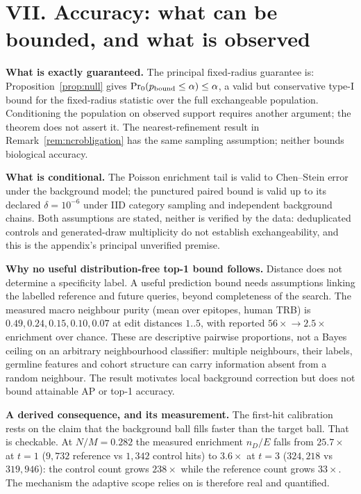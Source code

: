 \documentclass[10pt,a4paper]{article}
\theoremstyle{definition}
\begin{document}
\part*{VII. Accuracy: what can be bounded, and what is observed}
\label{sec:accobs}

\textbf{What is exactly guaranteed.} The principal fixed-radius guarantee is:
Proposition~\ref{prop:null} gives $\Pr_0(p_{\rm bound}\le\alpha)\le\alpha$, a valid but conservative
type-I bound for the fixed-radius statistic over the full exchangeable population. Conditioning the
population on observed support requires another argument; the theorem does not assert it. The nearest-refinement result in
Remark~\ref{rem:ncrobligation} has the same sampling assumption; neither bounds biological accuracy.

\textbf{What is conditional.} The Poisson enrichment tail is valid to Chen--Stein error under the
background model; the punctured paired bound is valid up to its declared $\delta=10^{-6}$ under IID
category sampling and independent background chains. Both assumptions are stated, neither is
verified by the data: deduplicated controls and generated-draw multiplicity do not establish
exchangeability, and this is the appendix's principal unverified premise.

\textbf{Why no useful distribution-free top-1 bound follows.} Distance does not determine a
specificity label. A useful prediction bound needs assumptions linking the labelled reference and
future queries, beyond completeness of the search. The measured macro neighbour purity (mean over
epitopes, human TRB) is $0.49,0.24,0.15,0.10,0.07$ at edit distances $1..5$, with reported
$56\times\!\to\!2.5\times$ enrichment over chance. These are descriptive pairwise proportions,
not a Bayes ceiling on an arbitrary neighbourhood classifier: multiple neighbours, their labels,
germline features and cohort structure can carry information absent from a random neighbour.
The result motivates local background correction but does not bound attainable AP or top-1 accuracy.

\textbf{A derived consequence, and its measurement.} The first-hit calibration rests on the claim
that the background ball fills faster than the target ball. That is checkable. At $N/M=0.282$ the
measured enrichment $n_D/E$ falls from $25.7\times$ at $t=1$ ($9{,}732$ reference vs $1{,}342$
control hits) to $3.6\times$ at $t=3$ ($324{,}218$ vs $319{,}946$): the control count grows
$238\times$ while the reference count grows $33\times$. The mechanism the adaptive scope relies on
is therefore real and quantified.
\end{document}
